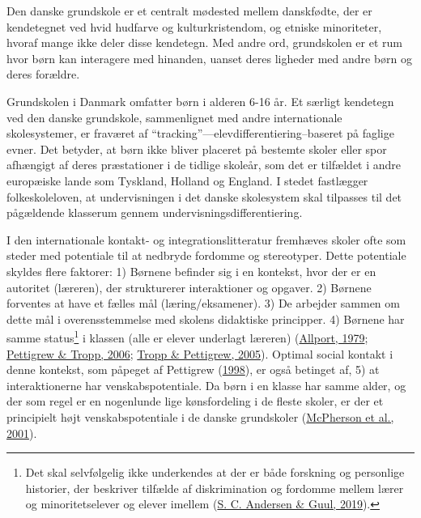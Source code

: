\documentclass[
]{book}
\begin{document}
Den danske grundskole er et centralt mødested mellem danskfødte, der er kendetegnet ved hvid hudfarve og kulturkristendom, og etniske minoriteter, hvoraf mange ikke deler disse kendetegn. Med andre ord, grundskolen er et rum hvor børn kan interagere med hinanden, uanset deres ligheder med andre børn og deres forældre.

Grundskolen i Danmark omfatter børn i alderen 6-16 år. Et særligt kendetegn ved den danske grundskole, sammenlignet med andre internationale skolesystemer, er fraværet af ``tracking''---elevdifferentiering--baseret på faglige evner. Det betyder, at børn ikke bliver placeret på bestemte skoler eller spor afhængigt af deres præstationer i de tidlige skoleår, som det er tilfældet i andre europæiske lande som Tyskland, Holland og England. I stedet fastlægger folkeskoleloven, at undervisningen i det danske skolesystem skal tilpasses til det pågældende klasserum gennem undervisningsdifferentiering.

I den internationale kontakt- og integrationslitteratur fremhæves skoler ofte som steder med potentiale til at nedbryde fordomme og stereotyper. Dette potentiale skyldes flere faktorer: 1) Børnene befinder sig i en kontekst, hvor der er en autoritet (læreren), der strukturerer interaktioner og opgaver. 2) Børnene forventes at have et fælles mål (læring/eksamener). 3) De arbejder sammen om dette mål i overensstemmelse med skolens didaktiske principper. 4) Børnene har samme status\footnote{Det skal selvfølgelig ikke underkendes at der er både forskning og personlige historier, der beskriver tilfælde af diskrimination og fordomme mellem lærer og minoritetselever og elever imellem (\protect\hyperlink{ref-andersen2019}{S. C. Andersen \& Guul, 2019}).} i klassen (alle er elever underlagt læreren) (\protect\hyperlink{ref-allport1979}{Allport, 1979}; \protect\hyperlink{ref-pettigrew2006}{Pettigrew \& Tropp, 2006}; \protect\hyperlink{ref-tropp2005}{Tropp \& Pettigrew, 2005}). Optimal social kontakt i denne kontekst, som påpeget af Pettigrew (\protect\hyperlink{ref-pettigrew1998}{1998}), er også betinget af, 5) at interaktionerne har venskabspotentiale. Da børn i en klasse har samme alder, og der som regel er en nogenlunde lige kønsfordeling i de fleste skoler, er der et principielt højt venskabspotentiale i de danske grundskoler (\protect\hyperlink{ref-mcpherson2001}{McPherson et al., 2001}).
\end{document}
